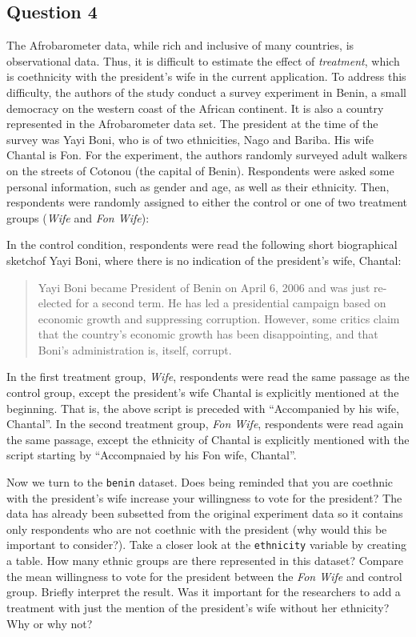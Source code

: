 \documentclass[]{article}
\begin{document}
\subsection{Question 4}\label{question-4}

The Afrobarometer data, while rich and inclusive of many countries, is
observational data. Thus, it is difficult to estimate the effect of
\emph{treatment}, which is coethnicity with the president's wife in the
current application. To address this difficulty, the authors of the
study conduct a survey experiment in Benin, a small democracy on the
western coast of the African continent. It is also a country represented
in the Afrobarometer data set. The president at the time of the survey
was Yayi Boni, who is of two ethnicities, Nago and Bariba. His wife
Chantal is Fon. For the experiment, the authors randomly surveyed adult
walkers on the streets of Cotonou (the capital of Benin). Respondents
were asked some personal information, such as gender and age, as well as
their ethnicity. Then, respondents were randomly assigned to either the
control or one of two treatment groups (\emph{Wife} and \emph{Fon
Wife}):

In the control condition, respondents were read the following short
biographical sketchof Yayi Boni, where there is no indication of the
president's wife, Chantal:

\begin{quote}
Yayi Boni became President of Benin on April 6, 2006 and was just
re-elected for a second term. He has led a presidential campaign based
on economic growth and suppressing corruption. However, some critics
claim that the country's economic growth has been disappointing, and
that Boni's administration is, itself, corrupt.
\end{quote}

In the first treatment group, \emph{Wife}, respondents were read the
same passage as the control group, except the president's wife Chantal
is explicitly mentioned at the beginning. That is, the above script is
preceded with ``Accompanied by his wife, Chantal''. In the second
treatment group, \emph{Fon Wife}, respondents were read again the same
passage, except the ethnicity of Chantal is explicitly mentioned with
the script starting by ``Accompnaied by his Fon wife, Chantal''.

Now we turn to the \texttt{benin} dataset. Does being reminded that you
are coethnic with the president's wife increase your willingness to vote
for the president? The data has already been subsetted from the original
experiment data so it contains only respondents who are not coethnic
with the president (why would this be important to consider?). Take a
closer look at the \texttt{ethnicity} variable by creating a table. How
many ethnic groups are there represented in this dataset? Compare the
mean willingness to vote for the president between the \emph{Fon Wife}
and control group. Briefly interpret the result. Was it important for
the researchers to add a treatment with just the mention of the
president's wife without her ethnicity? Why or why not?
\end{document}
